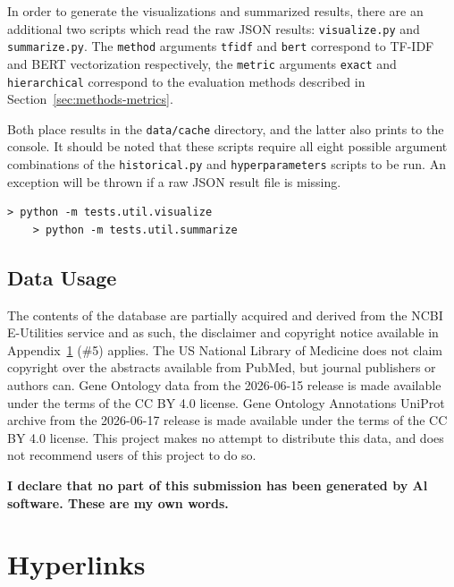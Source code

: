 \documentclass[11pt]{article}
\theoremstyle{plain}
\theoremstyle{definition}
\begin{document}
In order to generate the visualizations and summarized results, there are an additional two scripts which read the raw JSON results: \verb|visualize.py| and \verb|summarize.py|. The \verb|method| arguments \verb|tfidf| and \verb|bert| correspond to TF-IDF and BERT vectorization respectively, the \verb|metric| arguments \verb|exact| and \verb|hierarchical| correspond to the evaluation methods described in Section~\ref{sec:methods-metrics}.

Both place results in the \verb|data/cache| directory, and the latter also prints to the console. It should be noted that these scripts require all eight possible argument combinations of the \verb|historical.py| and \verb|hyperparameters| scripts to be run. An exception will be thrown if a raw JSON result file is missing.

\begin{Verbatim}[frame=single, fontsize=\small]
    > python -m tests.util.visualize
    > python -m tests.util.summarize
\end{Verbatim}

\subsection{Data Usage}\label{sec:manual-data}

The contents of the database are partially acquired and derived from the NCBI E-Utilities service and as such, the disclaimer and copyright notice available in Appendix~\ref{sec:appendix-hyperlinks} (\#5) applies. The US National Library of Medicine does not claim copyright over the abstracts available from PubMed, but journal publishers or authors can. Gene Ontology data from the 2026-06-15 release is made available under the terms of the CC BY 4.0 license. Gene Ontology Annotations UniProt archive from the 2026-06-17 release is made available under the terms of the CC BY 4.0 license. This project makes no attempt to distribute this data, and does not recommend users of this project to do so.





\textbf{I declare that no part of this submission has been generated by Al software. These are my own words.}

\appendix{}

\section{Hyperlinks}\label{sec:appendix-hyperlinks}
\end{document}
